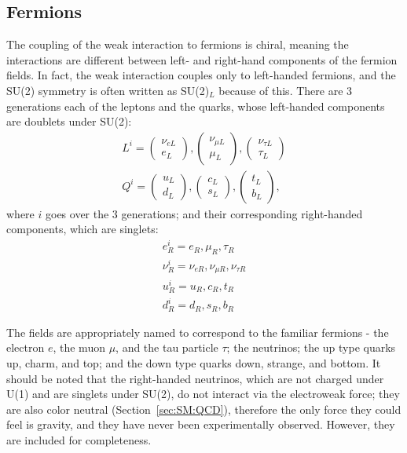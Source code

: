 \subsection{Fermions}
\label{sec:SM:EW_matter}
The coupling of the weak interaction to fermions is chiral, meaning the interactions are different between left- and right-hand components of the fermion fields.
In fact, the weak interaction couples only to left-handed fermions, and the SU(2) symmetry is often written as SU(2)$_L$ because of this.
There are $3$ generations each of the leptons and the quarks, whose left-handed components are doublets under SU(2):
\begin{align}
L^i = \begin{pmatrix}\nu_{eL}\\e_L\end{pmatrix},\begin{pmatrix}\nu_{\mu L}\\\mu_L\end{pmatrix},\begin{pmatrix}\nu_{\tau L}\\\tau_L\end{pmatrix}\\
Q^i = \begin{pmatrix}u_{L}\\d_L\end{pmatrix},\begin{pmatrix}c_{L}\\s_L\end{pmatrix},\begin{pmatrix}t_{L}\\b_L\end{pmatrix},
\end{align}
where $i$ goes over the $3$ generations; and their corresponding right-handed components, which are singlets:
\begin{align}
e^i_R = e_R,\mu_R,\tau_R\\
\nu^i_R = \nu_{eR},\nu_{\mu R},\nu_{\tau R}\\
u^i_R = u_R,c_R,t_R\\
d^i_R = d_R,s_R,b_R
\end{align}

The fields are appropriately named to correspond to the familiar fermions - the electron $e$, the muon $\mu$, and the tau particle $\tau$; the neutrinos; the up type quarks up, charm, and top; and the down type quarks down, strange, and bottom.
It should be noted that the right-handed neutrinos, which are not charged under U(1) and are singlets under SU(2), do not interact via the electroweak force; they are also color neutral (Section~\ref{sec:SM:QCD}), therefore the only force they could feel is gravity, and they have never been experimentally observed.
However, they are included for completeness.

